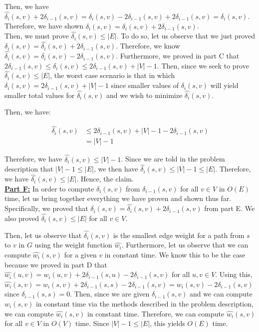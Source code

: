 \documentclass[11pt]{article}
\begin{document}
Then, we have $\hat{\delta_i}(s,v) + 2\delta_{i-1}(s,v) = \delta_i(s,v) - 2\delta_{i-1}(s,v) + 2\delta_{i-1}(s,v) = \delta_i(s,v)$. Therefore, we have shown $\delta_i(s,v) = \hat{\delta_i}(s,v) + 2\delta_{i-1}(s,v)$.\\

Then, we must prove $\hat{\delta_i}(s,v) \leq |E|$. To do so, let us observe that we just proved $\delta_i(s,v) = \hat{\delta_i}(s,v) + 2\delta_{i-1}(s,v)$. Therefore, we know $\hat{\delta_i}(s,v) = \delta_i(s,v) - 2\delta_{i-1}(s,v)$. Furthermore, we proved in part C that $2\delta_{i-1}(s,v) \leq \delta_i(s,v) \leq 2\delta_{i-1}(s,v) + |V| - 1$. Then, since we seek to prove $\hat{\delta_i}(s,v) \leq |E|$, the worst case scenario is that in which $\delta_i(s,v) = 2\delta_{i-1}(s,v) + |V| - 1$ since smaller values of $\delta_i(s,v)$ will yield smaller total values for $\hat{\delta_i}(s,v)$ and we wish to minimize $\hat{\delta_i}(s,v)$.

Then, we have:

\hspace*{3mm}
\begin{equation}
\begin{split}
\hat{\delta_i}(s,v) &\leq 2\delta_{i-1}(s,v) + |V| - 1 - 2\delta_{i-1}(s,v)\\
                    &= |V| - 1
\end{split}
\end{equation}

Therefore, we have $\hat{\delta_i}(s,v) \leq |V| - 1$. Since we are told in the problem description that $|V| - 1 \leq |E|$, we then have $\hat{\delta_i}(s,v) \leq |V| - 1 \leq |E|$. Therefore, we have $\hat{\delta_i}(s,v) \leq |E|$. Hence, the claim.\\

\underline{\textbf{Part F:}} In order to compute $\delta_i(s,v)$ from $\delta_{i-1}(s,v)$ for all $v \in V$ in $O(E)$ time, let us bring together everything we have proven and shown thus far. Specifically, we proved that $\delta_i(s,v) = \hat{\delta_i}(s,v) + 2\delta_{i-1}(s,v)$ from part E. We also proved $\hat{\delta_i}(s,v) \leq |E|$ for all $v \in V$.

Then, let us observe that $\hat{\delta_i}(s,v)$ is the smallest edge weight for a path from $s$ to $v$ in $G$ using the weight function $\hat{w_i}$. Furthermore, let us observe that we can compute $\hat{w_i}(s,v)$ for a given $v$ in constant time. We know this to be the case because we proved in part D that $\hat{w_i}(u,v) = w_i(u,v) + 2\delta_{i-1}(s,u) - 2\delta_{i-1}(s,v)$ for all $u,v \in V$. Using this, $\hat{w_i}(s,v) = w_i(s,v) + 2\delta_{i-1}(s,s) - 2\delta_{i-1}(s,v) = w_i(s,v) - 2\delta_{i-1}(s,v)$ since $\delta_{i-1}(s,s) = 0$. Then, since we are given $\delta_{i-1}(s,v)$ and we can compute $w_i(s,v)$ in constant time via the methods described in the problem description, we can compute $\hat{w_i}(s,v)$ in constant time. Therefore, we can compute $\hat{w_i}(s,v)$ for all $v \in V$ in $O(V)$ time. Since $|V| - 1 \leq |E|$, this yields $O(E)$ time.
\end{document}

